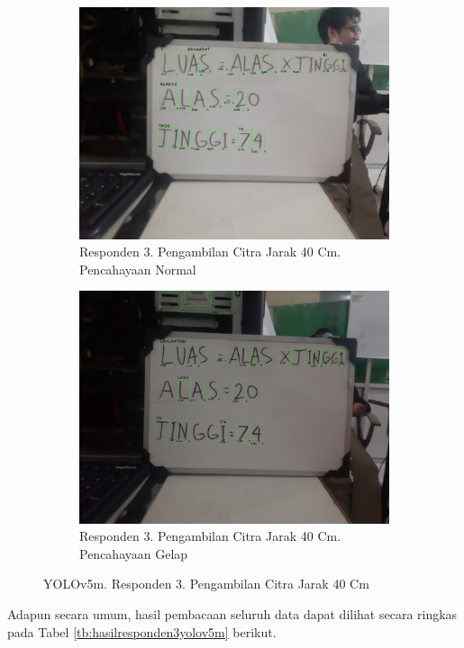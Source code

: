 \begin{figure}[H]
  \begin{subfigure}{.5\textwidth}
    \centering
    \captionsetup{width=.8\linewidth}
    \includegraphics[width=.8\linewidth]{gambar/yolov5m/responden3/hans40cm00-result.jpg}
    \caption{Responden 3. Pengambilan Citra Jarak 40 Cm. Pencahayaan Normal}
    \label{fig:mr3tcitra40cm}
  \end{subfigure}%
  \begin{subfigure}{.5\textwidth}
    \centering
    \captionsetup{width=.8\linewidth}
    \includegraphics[width=.8\linewidth]{gambar/yolov5m/responden3/hans40cm10-result.jpg}
    \caption{Responden 3. Pengambilan Citra Jarak 40 Cm. Pencahayaan Gelap}
    \label{fig:mr3gcitra40cm}
  \end{subfigure}
  \caption{YOLOv5m. Responden 3. Pengambilan Citra Jarak 40 Cm}
  \label{fig:mr3citra40cm}
\end{figure}

Adapun secara umum, hasil pembacaan seluruh data dapat dilihat secara ringkas pada Tabel \ref*{tb:hasilresponden3yolov5m} berikut.

